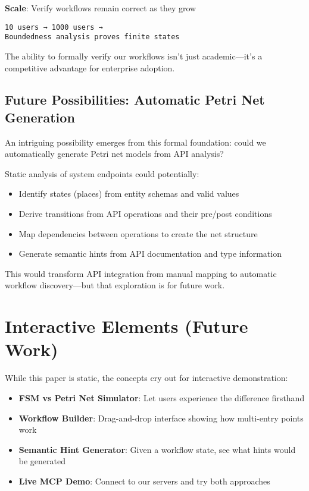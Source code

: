 \documentclass[11pt,a4paper]{article}
\begin{document}
\textbf{Scale}: Verify workflows remain correct as they grow
\begin{verbatim}
10 users → 1000 users →
Boundedness analysis proves finite states
\end{verbatim}

The ability to formally verify our workflows isn't just academic—it's a competitive advantage for enterprise adoption.

\subsection{Future Possibilities: Automatic Petri Net Generation}

An intriguing possibility emerges from this formal foundation: could we automatically generate Petri net models from API analysis? 

Static analysis of system endpoints could potentially:
\begin{itemize}
\item Identify states (places) from entity schemas and valid values
\item Derive transitions from API operations and their pre/post conditions  
\item Map dependencies between operations to create the net structure
\item Generate semantic hints from API documentation and type information
\end{itemize}

This would transform API integration from manual mapping to automatic workflow discovery—but that exploration is for future work.

\section{Interactive Elements (Future Work)}

While this paper is static, the concepts cry out for interactive demonstration:

\begin{itemize}
\item \textbf{FSM vs Petri Net Simulator}: Let users experience the difference firsthand
\item \textbf{Workflow Builder}: Drag-and-drop interface showing how multi-entry points work
\item \textbf{Semantic Hint Generator}: Given a workflow state, see what hints would be generated
\item \textbf{Live MCP Demo}: Connect to our servers and try both approaches
\end{itemize}
\end{document}
